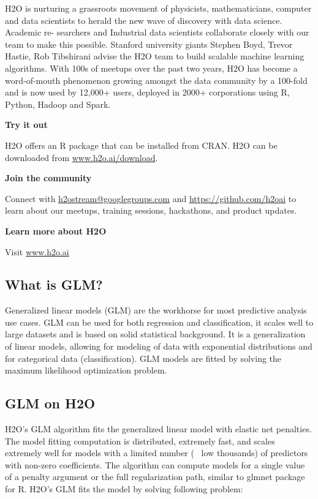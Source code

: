 \documentclass[11pt]{article}
\begin{document}
H2O is nurturing a grassroots movement of physicists, mathematicians, computer and data scientists to herald the new wave of discovery with data science. Academic re- searchers and Industrial data scientists collaborate closely with our team to make this possible. Stanford university giants Stephen Boyd, Trevor Hastie, Rob Tibshirani advise the H2O team to build scalable machine learning algorithms. With 100s of meetups over the past two years, H2O has become a word-of-mouth phenomenon growing amongst the data community by a 100-fold and is now used by 12,000+ users, deployed in 2000+ corporations using R, Python, Hadoop and Spark.

\textbf{Try it out}

H2O offers an R package that can be installed from CRAN. H2O can be downloaded from \url{www.h2o.ai/download}.

\textbf{Join the community}

Connect with \url{h2ostream@googlegroups.com} and \url{https://github.com/h2oai} to learn about our meetups, training sessions, hackathons, and product updates.

\textbf{Learn more about H2O}

Visit \url{www.h2o.ai}

\subsection{What is GLM?}
Generalized linear models (GLM) are the workhorse for most predictive analysis use cases. GLM can be used for both regression and classification, it scales well to large datasets and is based on solid statistical background. It is a generalization of linear models, allowing for modeling of data with exponential distributions and for categorical data (classification). GLM models are fitted by solving the maximum likelihood optimization problem.

\subsection{GLM on H2O}
H2O's GLM algorithm fits the generalized linear model with elastic net penalties. The model fitting computation is distributed, extremely fast, and scales extremely well for models with a limited number (~ low thousands) of predictors with non-zero coefficients. The algorithm can compute models for a single value of a penalty argument or the full regularization path, similar to glmnet package for R\cite{glmnet}. 
H2O's GLM fits the model by solving following problem:
\end{document}
